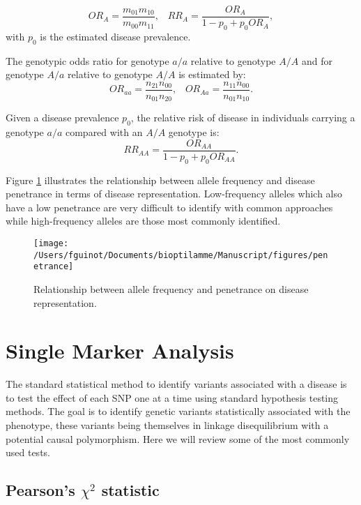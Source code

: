 \documentclass[]{book}
\begin{document}
\[OR_A = \frac{m_{01}m_{10}}{m_{00}m_{11}}, \hspace{10pt} RR_A = \frac{OR_A}{1 - p_0 + p_0 OR_A},\]
with \(p_0\) is the estimated disease prevalence.

The genotypic odds ratio for genotype \(a/a\) relative to genotype \(A/A\)
and for genotype \(A/a\) relative to genotype \(A/A\) is estimated by:
\[OR_{aa} =  \frac{n_{21}n_{00}}{n_{01}n_{20}}, \hspace{10pt} OR_{Aa} = \frac{n_{11}n_{00}}{n_{01}n_{10}}.\]

Given a disease prevalence \(p_0\), the relative risk of disease in
individuals carrying a genotype \(a/a\) compared with an \(A/A\) genotype
is: \[RR_{AA} = \frac{OR_{AA}}{1-p_0 + p_0 OR_{AA}}.\]

Figure \ref{fig:penetrancefig} illustrates the relationship between allele
frequency and disease penetrance in terms of disease representation.
Low-frequency alleles which also have a low penetrance are very
difficult to identify with common approaches while high-frequency
alleles are those most commonly identified.



\begin{figure}

{\centering \texttt{[image: /Users/fguinot/Documents/bioptilamme/Manuscript/figures/penetrance]} 

}

\caption{Relationship between allele frequency and penetrance on disease representation.}\label{fig:penetrancefig}
\end{figure}

\hypertarget{SMA}{%
\section{Single Marker Analysis}\label{SMA}}

The standard statistical method to identify variants associated with a
disease is to test the effect of each SNP one at a time using standard
hypothesis testing methods. The goal is to identify genetic variants
statistically associated with the phenotype, these variants being
themselves in linkage disequilibrium with a potential causal
polymorphism. Here we will review some of the most commonly used tests.

\hypertarget{pearsons-chi2-statistic}{%
\subsection{\texorpdfstring{Pearson's \(\chi^2\) statistic}{Pearson's \textbackslash{}chi\^{}2 statistic}}\label{pearsons-chi2-statistic}}
\end{document}
